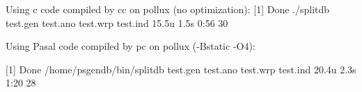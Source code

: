 Using c code compiled by cc on pollux (no optimization):
[1]    Done                 ./splitdb test.gen test.ano test.wrp test.ind
15.5u 1.5s 0:56 30%


Using Pasal code compiled by pc on pollux (-Bstatic -O4):

[1]    Done                 /home/psgendb/bin/splitdb test.gen test.ano test.wrp test.ind
20.4u 2.3s 1:20 28%
 
